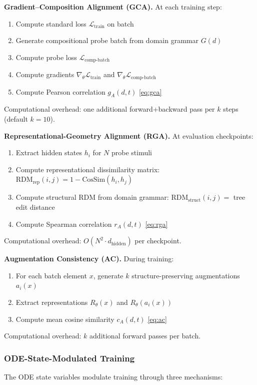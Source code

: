 \documentclass[11pt,a4paper]{article}
\begin{document}
\textbf{Gradient--Composition Alignment (GCA).} At each training step:
\begin{enumerate}[nosep]
\item Compute standard loss $\mathcal{L}_{\text{train}}$ on batch
\item Generate compositional probe batch from domain grammar $G(d)$
\item Compute probe loss $\mathcal{L}_{\text{comp-batch}}$
\item Compute gradients $\nabla_\theta \mathcal{L}_{\text{train}}$ and $\nabla_\theta \mathcal{L}_{\text{comp-batch}}$
\item Compute Pearson correlation $g_A(d,t)$ \eqref{eq:gca}
\end{enumerate}
Computational overhead: one additional forward+backward pass per $k$ steps
(default $k=10$).

\textbf{Representational-Geometry Alignment (RGA).} At evaluation checkpoints:
\begin{enumerate}[nosep]
\item Extract hidden states $h_i$ for $N$ probe stimuli
\item Compute representational dissimilarity matrix: $\text{RDM}_{\text{rep}}(i,j) = 1 - \text{CosSim}(h_i, h_j)$
\item Compute structural RDM from domain grammar: $\text{RDM}_{\text{struct}}(i,j) = $ tree edit distance
\item Compute Spearman correlation $r_A(d,t)$ \eqref{eq:rga}
\end{enumerate}
Computational overhead: $O(N^2 \cdot d_{\text{hidden}})$ per checkpoint.

\textbf{Augmentation Consistency (AC).} During training:
\begin{enumerate}[nosep]
\item For each batch element $x$, generate $k$ structure-preserving augmentations $a_i(x)$
\item Extract representations $R_\theta(x)$ and $R_\theta(a_i(x))$
\item Compute mean cosine similarity $c_A(d,t)$ \eqref{eq:ac}
\end{enumerate}
Computational overhead: $k$ additional forward passes per batch.

\subsubsection{ODE-State-Modulated Training}

The ODE state variables modulate training through three mechanisms:
\end{document}
